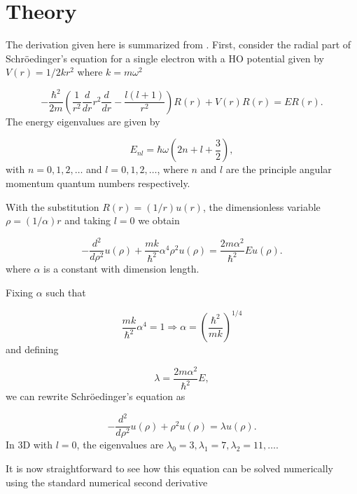 \documentclass[10pt,showpacs,preprintnumbers,footinbib,amsmath,amssymb,aps,prl,twocolumn,groupedaddress,superscriptaddress,showkeys]{revtex4-1}
\begin{document}
\section{Theory}

The derivation given here is summarized from \citet{Morten}.
First, consider the radial part of Schr\"{o}edinger's equation for a
single electron with a HO potential given by $V(r) = 1/2 kr^2$
where $k = m \omega^2$

\begin{equation*}
  -\frac{\hbar^2}{2 m} \left ( \frac{1}{r^2} \frac{d}{dr} r^2
  \frac{d}{dr} - \frac{l (l + 1)}{r^2} \right )R(r) 
     + V(r) R(r) = E R(r).
\end{equation*}
The energy eigenvalues are given by

\begin{equation}
E_{nl}=  \hbar \omega \left(2n+l+\frac{3}{2}\right),
\label{eq:enl}
\end{equation}
with $n=0,1,2,\dots$ and $l=0,1,2,\dots$, where $n$ and $l$
are the principle angular momentum quantum numbers
respectively.

With the substitution $R(r) = (1/r) u(r)$, the dimensionless variable
$\rho = (1/ \alpha) r$ and taking $l=0$ we obtain

\begin{equation*}
  -\frac{d^2}{d\rho^2} u(\rho) 
       + \frac{mk}{\hbar^2} \alpha^4\rho^2u(\rho)  = \frac{2m\alpha^2}{\hbar^2}E u(\rho) .
\end{equation*}
where $\alpha$ is a constant with dimension length.

Fixing $\alpha$ such that

\begin{equation*}
\frac{mk}{\hbar^2} \alpha^4 = 1 \Rightarrow \alpha = \left(\frac{\hbar^2}{mk}\right)^{1/4}
\end{equation*}
and defining

\begin{equation*}
\lambda = \frac{2m\alpha^2}{\hbar^2}E,
\end{equation*}
we can rewrite Schr\"{o}edinger's equation as

\begin{equation}
  -\frac{d^2}{d\rho^2} u(\rho) + \rho^2u(\rho)  = \lambda u(\rho) .
\label{eq:1bseq}
\end{equation}
In 3D with $l=0$, the eigenvalues are
$\lambda_0=3,\lambda_1=7,\lambda_2=11,\dots .$

It is now straightforward to see how this equation can be solved numerically using the standard
numerical second derivative
\end{document}
